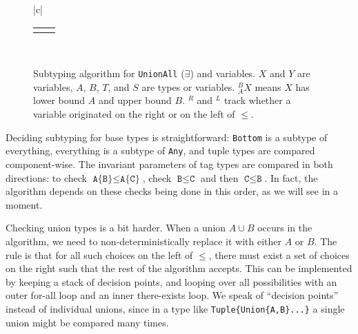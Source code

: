 \begin{figure}[!t]
\begin{center}
\begin{tabular}{|c|}
\begin{tabular}{cc}
        \AxiomC{$_A^BX^R,\Gamma\ \vdash\ A \leq T$}
        \UnaryInfC{$_A^TX^R,\Gamma\ \vdash\ X \leq T$}
        \DisplayProof

        \hspace{4ex}

        &

        \AxiomC{$_A^BX^R,\Gamma\ \vdash\ T \leq B$}
        \UnaryInfC{$_{A \cup T}^{\ \ \ B}X^R,\Gamma\ \vdash\ T \leq X$}
        \DisplayProof

        \\[8pt]
      \end{tabular}
      \\
      \hline
    \end{tabular}
  \end{center}
  \caption[Subtyping algorithm]{
\small{
    Subtyping algorithm for \texttt{UnionAll} ($\exists$) and variables.
    $X$ and $Y$ are variables, $A$, $B$, $T$, and $S$ are types or variables.
    $_A^BX$ means $X$ has lower bound $A$ and upper bound $B$.
    $^R$ and $^L$ track whether a variable originated on the right or on the left of
    $\leq$.
}
  }
  \label{subtvars}
\end{figure}


Deciding subtyping for base types is straightforward: \texttt{Bottom} is
a subtype of everything, everything is a subtype of \texttt{Any}, and
tuple types are compared component-wise. The invariant parameters
of tag types are compared in both directions: to check
$\texttt{A\{B\}}\leq \texttt{A\{C\}}$, check $\texttt{B}\leq\texttt{C}$ and
then $\texttt{C}\leq\texttt{B}$. In fact, the algorithm depends on these
checks being done in this order, as we will see in a moment.

Checking union types is a bit harder. When a union $A\cup B$ occurs in the
algorithm, we need to non-deterministically replace it with either $A$ or
$B$. The rule is that for all such choices on the left of $\leq$, there
must exist a set of choices on the right such that the rest of the
algorithm accepts. This can be implemented by keeping a stack of
decision points, and looping over all possibilities with an outer
for-all loop and an inner there-exists loop. We speak of ``decision points''
instead of individual unions, since in a type like \texttt{Tuple\{Union\{A,B\}...\}}
a single union might be compared many times.

